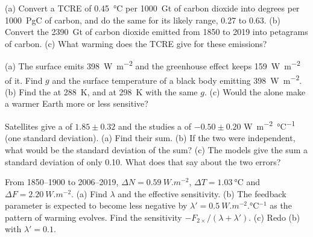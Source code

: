\begin{exercise}[$\star$]\label{exo:b2:anthropogenic-climate-change:4}
(a) Convert a TCRE of \qty{0.45}{\celsius} per \qty{1000}{Gt} of carbon dioxide into degrees per
\qty{1000}{PgC} of carbon, and do the same for its likely range, 0.27 to 0.63. (b) Convert the
\qty{2390}{Gt} of carbon dioxide emitted from 1850 to 2019 into petagrams of carbon. (c) What
warming does the TCRE give for these emissions?
\end{exercise}

\begin{exercise}[$\star\star$]\label{exo:b2:anthropogenic-climate-change:5}
(a) The surface emits \qty{398}{W.m^{-2}} and the greenhouse effect keeps \qty{159}{W.m^{-2}} of
it. Find $g$ and the surface temperature of a black body emitting \qty{398}{W.m^{-2}}. (b) Find the
 at \qty{288}{K}, and at \qty{298}{K} with the same $g$. (c) Would the  alone make a warmer Earth more or less sensitive?
\end{exercise}

\begin{exercise}[$\star\star$]\label{exo:b2:anthropogenic-climate-change:6}
Satellites give a  of $1.85 \pm 0.32$ and the studies a  of
$-0.50 \pm 0.20$ \unit{W.m^{-2}.\celsius^{-1}} (one standard deviation). (a) Find their sum.
(b) If the two were independent, what would be the standard deviation of the sum? (c) The models
give the sum a standard deviation of only \num{0.10}. What does that say about the two errors?
\end{exercise}

\begin{exercise}[$\star\star$]\label{exo:b2:anthropogenic-climate-change:7}
From 1850--1900 to 2006--2019, $\Delta N = \qty{0.59}{W.m^{-2}}$, $\Delta T = \qty{1.03}{\celsius}$
and $\Delta F = \qty{2.20}{W.m^{-2}}$. (a) Find $\lambda$ and the effective sensitivity. (b) The
feedback parameter is expected to become less negative by $\lambda' = \qty{0.5}{W.m^{-2}.\celsius^{-1}}$
as the pattern of warming evolves. Find the sensitivity $-F_{2\times}/(\lambda + \lambda')$.
(c) Redo (b) with $\lambda' = 0.1$.
\end{exercise}

